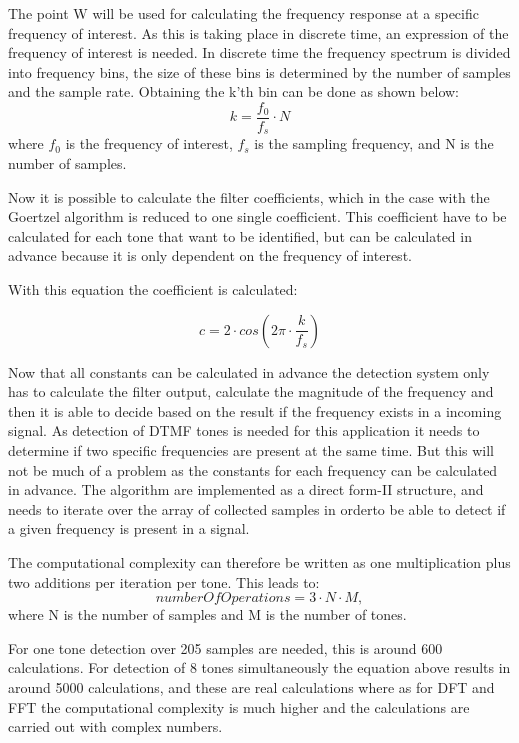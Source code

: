 	The point W will be used for calculating the frequency response at a specific frequency of interest. As this is taking
	place in discrete time, an expression of the frequency of interest is needed. In discrete time the frequency spectrum
	is divided into frequency bins, the size of these bins is determined by the number of samples and the sample rate.
	Obtaining the k'th bin can be done as shown below:
	\begin{equation}k = \frac{f_{0}}{f_{s}}\cdot N\end{equation}
	where $f_{0}$ is the frequency of interest, $f_{s}$ is the sampling frequency, and N is the number of samples.
	
	Now it is possible to calculate the filter coefficients, which in the case with the Goertzel algorithm is reduced 
	to one single coefficient. This coefficient have to be calculated for each tone that want to be identified, but can 
	be calculated in advance because it is only dependent on the frequency of interest.
	
	With this equation the coefficient is calculated:
	
\begin{equation}c = 2\cdot cos(2\pi \cdot \frac{k}{f_{s}})\end{equation}
	
	Now that all constants can be calculated in advance the detection system only has to calculate the filter output, calculate
	the magnitude of the frequency and then it is able to decide based on the result if the frequency exists in a incoming signal.
	As detection of DTMF tones is needed for this application it needs to determine if two specific frequencies are present at the
	same time. But this will not be much of a problem as the constants for each frequency can be calculated in advance.
	The algorithm are implemented as a direct form-II structure, and needs to iterate over the array of collected samples in orderto be
	able to detect if a given frequency is present in a signal.
	
	The computational complexity can therefore be written as one multiplication plus two additions per iteration per tone.
	This leads to:
	\begin{equation}numberOfOperations = 3\cdot N\cdot M,\end{equation}
	where N is the number of samples and M is the number of tones.
	
	For one tone detection over 205 samples are needed, this is around 600 calculations. For detection of 8 tones simultaneously the equation
	above results in around 5000 calculations, and these are real calculations where as for DFT and FFT the computational complexity 
	is much higher and the calculations are carried out with complex numbers.
	

